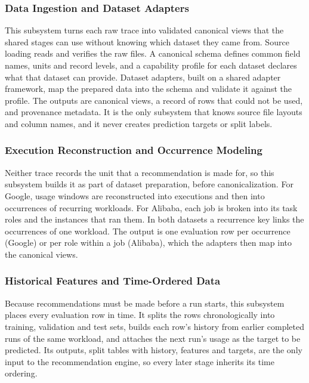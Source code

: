 \documentclass{IEEEtran}
\begin{document}
\subsubsection{Data Ingestion and Dataset Adapters}\label{sec:2.2.1}

This subsystem turns each raw trace into validated canonical views that the shared stages can use without knowing which dataset they came from. Source loading reads and verifies the raw files. A canonical schema defines common field names, units and record levels, and a capability profile for each dataset declares what that dataset can provide. Dataset adapters, built on a shared adapter framework, map the prepared data into the schema and validate it against the profile. The outputs are canonical views, a record of rows that could not be used, and provenance metadata. It is the only subsystem that knows source file layouts and column names, and it never creates prediction targets or split labels.

\subsubsection{Execution Reconstruction and Occurrence Modeling}\label{sec:2.2.2}

Neither trace records the unit that a recommendation is made for, so this subsystem builds it as part of dataset preparation, before canonicalization. For Google, usage windows are reconstructed into executions and then into occurrences of recurring workloads. For Alibaba, each job is broken into its task roles and the instances that ran them. In both datasets a recurrence key links the occurrences of one workload. The output is one evaluation row per occurrence (Google) or per role within a job (Alibaba), which the adapters then map into the canonical views.

\subsubsection{Historical Features and Time-Ordered Data}\label{sec:2.2.3}

Because recommendations must be made before a run starts, this subsystem places every evaluation row in time. It splits the rows chronologically into training, validation and test sets, builds each row's history from earlier completed runs of the same workload, and attaches the next run's usage as the target to be predicted. Its outputs, split tables with history, features and targets, are the only input to the recommendation engine, so every later stage inherits its time ordering.
\end{document}
